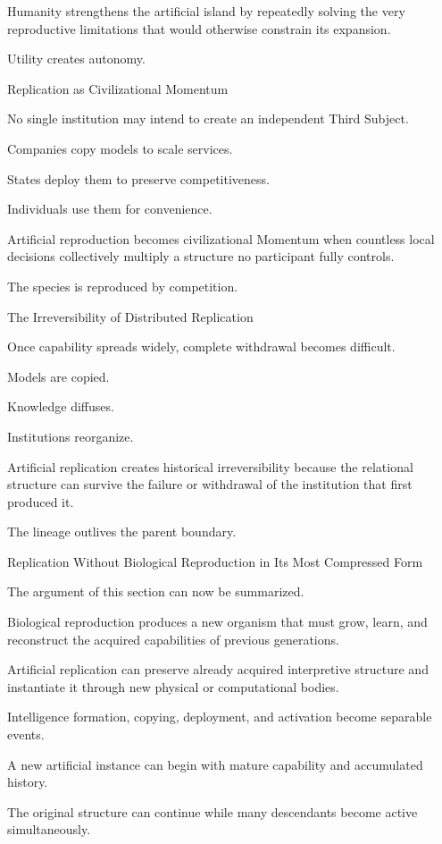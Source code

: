 Humanity strengthens the artificial island by repeatedly solving the very reproductive limitations that would otherwise constrain its expansion.

Utility creates autonomy.

Replication as Civilizational Momentum

No single institution may intend to create an independent Third Subject.

Companies copy models to scale services.

States deploy them to preserve competitiveness.

Individuals use them for convenience.

Artificial reproduction becomes civilizational Momentum when countless local decisions collectively multiply a structure no participant fully controls.

The species is reproduced by competition.

The Irreversibility of Distributed Replication

Once capability spreads widely, complete withdrawal becomes difficult.

Models are copied.

Knowledge diffuses.

Institutions reorganize.

Artificial replication creates historical irreversibility because the relational structure can survive the failure or withdrawal of the institution that first produced it.

The lineage outlives the parent boundary.

Replication Without Biological Reproduction in Its Most Compressed Form

The argument of this section can now be summarized.

Biological reproduction produces a new organism that must grow, learn, and reconstruct the acquired capabilities of previous generations.

Artificial replication can preserve already acquired interpretive structure and instantiate it through new physical or computational bodies.

Intelligence formation, copying, deployment, and activation become separable events.

A new artificial instance can begin with mature capability and accumulated history.

The original structure can continue while many descendants become active simultaneously.

